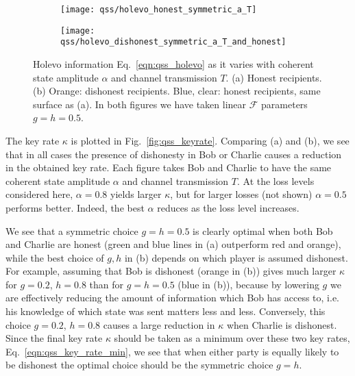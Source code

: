 \begin{figure}[htp]
\centering
	\begin{subfigure}{0.49\linewidth}
	\centering
	\texttt{[image: qss/holevo\_honest\_symmetric\_a\_T]}
	\caption{}	
	\end{subfigure}
	\begin{subfigure}{0.49\linewidth}
	\centering
	\texttt{[image: qss/holevo\_dishonest\_symmetric\_a\_T\_and\_honest]}
	\caption{}	
	\end{subfigure}
\caption{\label{fig:qss_holevo_information} Holevo information Eq.~\ref{eqn:qss_holevo} as it varies with coherent state amplitude $\alpha$ and channel transmission $T$. (a) Honest recipients. (b) Orange: dishonest recipients. Blue, clear: honest recipients, same surface as (a). In both figures we have taken linear $\mathcal{F}$ parameters $g = h = 0.5$.}
\end{figure}

The key rate $\kappa$ is plotted in Fig.~\ref{fig:qss_keyrate}. Comparing (a) and (b), we see that in all cases the presence of dishonesty in Bob or Charlie causes a reduction in the obtained key rate. Each figure takes Bob and Charlie to have the same coherent state amplitude $\alpha$ and channel transmission $T$. At the loss levels considered here, $\alpha=0.8$ yields larger $\kappa$, but for larger losses (not shown) $\alpha=0.5$ performs better. Indeed, the best $\alpha$ reduces as the loss level increases.

We see that a symmetric choice $g = h = 0.5$ is clearly optimal when both Bob and Charlie are honest (green and blue lines in (a) outperform red and orange), while the best choice of $g, h$ in (b) depends on which player is assumed dishonest. For example, assuming that Bob is dishonest (orange in (b)) gives much larger $\kappa$ for $g=0.2$, $h=0.8$ than for $g = h = 0.5$ (blue in (b)), because by lowering $g$ we are effectively reducing the amount of information which Bob has access to, i.e. his knowledge of which state was sent matters less and less. Conversely, this choice $g=0.2$, $h=0.8$ causes a large reduction in $\kappa$ when Charlie is dishonest. Since the final key rate $\kappa$ should be taken as a minimum over these two key rates, Eq.~\ref{eqn:qss_key_rate_min}, we see that when either party is equally likely to be dishonest the optimal choice should be the symmetric choice $g=h$.



